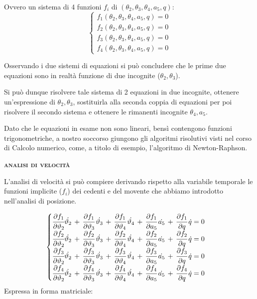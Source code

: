 		Ovvero un sistema di 4 funzioni $f_i$ di $(\theta_2,\theta_3,\theta_4, a_5, q)$:
		\[
		\begin{cases}
		f_1(\theta_2,\theta_3,\theta_4, a_5, q)=0\\
		f_2(\theta_2,\theta_3,\theta_4, a_5, q)=0\\
		f_3(\theta_2,\theta_3,\theta_4, a_5, q)=0\\
		f_4(\theta_2,\theta_3,\theta_4, a_5, q)=0
		\end{cases}
		\]
		
		Osservando i due sistemi di equazioni si può concludere che le prime due equazioni sono in realtà funzione di due incognite ($\theta_2,\theta_3$).
		
		 Si può dunque risolvere tale sistema di 2 equazioni in due incognite, ottenere un'espressione di $\theta_2,\theta_3$, sostituirla alla seconda coppia di equazioni per poi risolvere il secondo sistema e ottenere le rimanenti incognite $\theta_4, a_5$.
		
		Dato che le equazioni in esame non sono lineari, bensì contengono funzioni trigonometriche, a nostro soccorso giungono gli algoritmi risolutivi visti nel corso di Calcolo numerico, come, a titolo di esempio, l'algoritmo di Newton-Raphson.
		
		\begin{center}
			{\scshape{\bfseries analisi di velocità}}
		\end{center}
		
		L'analisi di velocità si può compiere derivando rispetto alla variabile temporale le funzioni implicite ($f_i$) dei cedenti e del movente che abbiamo introdotto nell'analisi di posizione.
		
		\[
		\begin{cases}
		\cfrac{\partial f_1}{\partial\vartheta_2}\dot{\vartheta_2}\,+\,\cfrac{\partial f_1}{\partial\vartheta_3}\,\dot{\vartheta_3}\,+\,\cfrac{\partial f_1}{\partial\vartheta_4}\,\dot{\vartheta_4}\,+\,\cfrac{\partial f_1}{\partial a_5}\,\dot{a_5}\,+\,\cfrac{\partial f_1}{\partial q}\,\dot{q}=0\\
		\cfrac{\partial f_2}{\partial\vartheta_2}\dot{\vartheta_2}\,+\,\cfrac{\partial f_2}{\partial\vartheta_3}\,\dot{\vartheta_3}\,+\,\cfrac{\partial f_2}{\partial\vartheta_4}\,\dot{\vartheta_4}\,+\,\cfrac{\partial f_2}{\partial a_5}\,\dot{a_5}\,+\,\cfrac{\partial f_2}{\partial q}\,\dot{q}=0\\
		\cfrac{\partial f_3}{\partial\vartheta_2}\dot{\vartheta_2}\,+\,\cfrac{\partial f_3}{\partial\vartheta_3}\,\dot{\vartheta_3}\,+\,\cfrac{\partial f_3}{\partial\vartheta_4}\,\dot{\vartheta_4}\,+\,\cfrac{\partial f_3}{\partial a_5}\,\dot{a_5}\,+\,\cfrac{\partial f_3}{\partial q}\,\dot{q}=0\\
		\cfrac{\partial f_4}{\partial\vartheta_2}\dot{\vartheta_2}\,+\,\cfrac{\partial f_4}{\partial\vartheta_3}\,\dot{\vartheta_3}\,+\,\cfrac{\partial f_4}{\partial\vartheta_4}\,\dot{\vartheta_4}\,+\,\cfrac{\partial f_4}{\partial a_5}\,\dot{a_5}\,+\,\cfrac{\partial f_4}{\partial q}\,\dot{q}=0		
		\end{cases}
		\]
		Espressa in forma matriciale:
		
